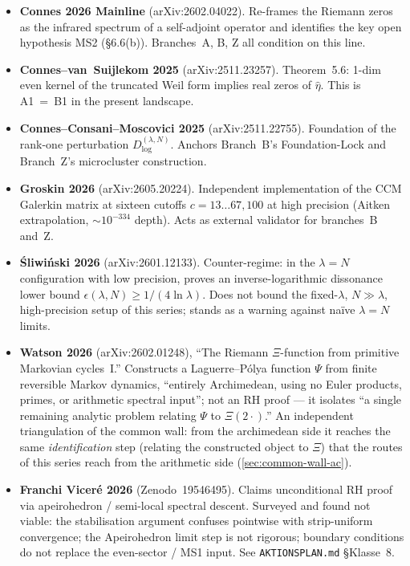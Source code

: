 \documentclass[12pt,a4paper]{article}
\theoremstyle{definition}
\theoremstyle{remark}
\begin{document}
\begin{itemize}
  \item \textbf{Connes 2026 Mainline} \cite{Connes2026}
    (arXiv:2602.04022). Re-frames the Riemann zeros as the infrared
    spectrum of a self-adjoint operator and identifies the key open
    hypothesis MS2 (\S6.6(b)). Branches~A, B, Z all condition on this
    line.

  \item \textbf{Connes--van~Suijlekom 2025} \cite{ConnesvS2025}
    (arXiv:2511.23257). Theorem~5.6: 1-dim even kernel of the truncated
    Weil form implies real zeros of $\hat\eta$. This is A1~=~B1 in the
    present landscape.

  \item \textbf{Connes--Consani--Moscovici 2025}
    \cite{ConnesMoscovici2023} (arXiv:2511.22755). Foundation of the
    rank-one perturbation $D^{(\lambda,N)}_{\log}$. Anchors Branch~B's
    Foundation-Lock and Branch~Z's microcluster construction.

  \item \textbf{Groskin 2026} (arXiv:2605.20224). Independent
    implementation of the CCM Galerkin matrix at sixteen cutoffs
    $c=13\ldots 67, 100$ at high precision (Aitken extrapolation,
    $\sim 10^{-334}$ depth). Acts as external validator for branches~B
    and~Z.

  \item \textbf{\'Sliwi\'nski 2026} (arXiv:2601.12133). Counter-regime:
    in the $\lambda = N$ configuration with low precision, proves an
    inverse-logarithmic dissonance lower bound
    $\epsilon(\lambda,N)\ge 1/(4\ln\lambda)$. Does not bound the
    fixed-$\lambda$, $N\gg\lambda$, high-precision setup of this
    series; stands as a warning against na\"ive $\lambda = N$ limits.

  \item \textbf{Watson 2026} (arXiv:2602.01248), ``The Riemann
    $\Xi$-function from primitive Markovian cycles~I.'' Constructs a
    Laguerre--P\'olya function $\Psi$ from finite reversible Markov dynamics,
    ``entirely Archimedean, using no Euler products, primes, or arithmetic
    spectral input''; not an RH proof --- it isolates ``a single remaining
    analytic problem relating $\Psi$ to $\Xi(2\cdot)$.'' An independent
    triangulation of the common wall: from the archimedean side it reaches the
    same \emph{identification} step (relating the constructed object to $\Xi$)
    that the routes of this series reach from the arithmetic side
    (\cref{sec:common-wall-ac}).

  \item \textbf{Franchi Vicer\'e 2026} (Zenodo~19546495). Claims
    unconditional RH proof via apeirohedron / semi-local spectral
    descent. Surveyed and found not viable: the stabilisation argument
    confuses pointwise with strip-uniform convergence; the Apeirohedron
    limit step is not rigorous; boundary conditions do not replace the
    even-sector / MS1 input. See \texttt{AKTIONSPLAN.md} \S Klasse~8.
\end{itemize}
\end{document}
